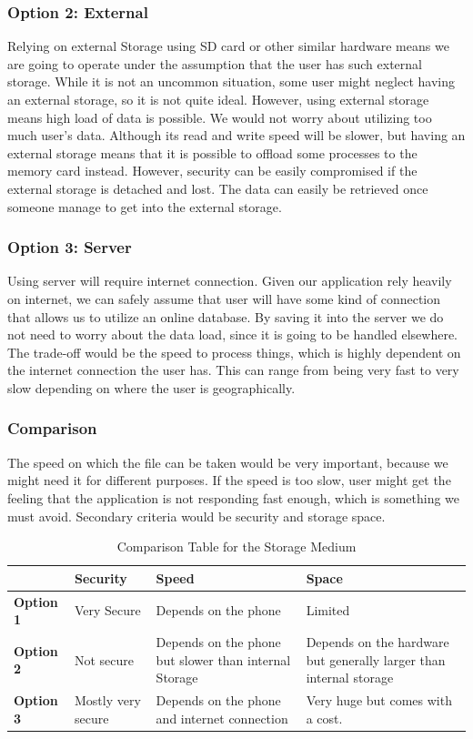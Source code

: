 \documentclass[journal,compsoc, 10pt, draftclsnofoot, onecolumn]{IEEEtran}
\begin{document}
\subsubsection*{Option 2: External}
Relying on external Storage using SD card or other similar hardware means we are
going to operate under the assumption that the user has such external storage. While
it is not an uncommon situation, some user might neglect having an external storage,
so it is not quite ideal. However, using external storage means high load of data is
possible. We would not worry about utilizing too much user's data. Although its read
and write speed will be slower, but having an external storage means that it is
possible to offload some processes to the memory card instead. However, security can
be easily compromised if the external storage is detached and lost. The data can
easily be retrieved once someone manage to get into the external storage.

\subsubsection*{Option 3: Server}
Using server will require internet connection. Given our application rely heavily on
internet, we can safely assume that user will have some kind of connection that
allows us to utilize an online database. By saving it into the server we do not need
to worry about the data load, since it is going to be handled elsewhere. The
trade-off would be the speed to process things, which is highly dependent on the
internet connection the user has. This can range from being very fast to very slow
depending on where the user is geographically.

\subsubsection*{Comparison}
The speed on which the file can be taken would be very important, because we might
need it for different purposes. If the speed is too slow, user might get the feeling
that the application is not responding fast enough, which is something we must avoid.
Secondary criteria would be security and storage space.

\begin{table}[h]
	\centering
	\caption{Comparison Table for the Storage Medium}
	\label{Comparison Table for the Storage Medium}
	\begin{tabularx}{\textwidth}{|X|X|X|X|}
		\hline
\textbf{} & \textbf{Security} & \textbf{Speed} &\textbf{Space} \\ \hline
		\textbf{Option 1} & Very Secure & Depends on the phone & Limited
		\\ \hline
\textbf{Option 2} & Not secure & Depends on the phone but slower than internal
Storage & Depends on the hardware but generally larger than internal storage
		\\ \hline
\textbf{Option 3} & Mostly very secure &Depends on the phone and internet connection
& Very huge but comes with a cost.
		\\ \hline
	\end{tabularx}
\end{table}
\end{document}
